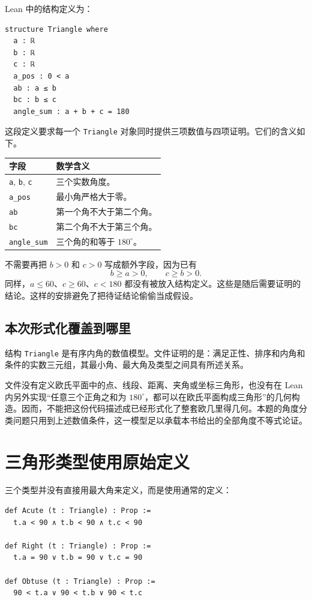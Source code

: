 \documentclass[UTF8,a4paper,zihao=-4,oneside,openany,fontset=fandol]{ctexbook}
\theoremstyle{definition}
\theoremstyle{remark}
\begin{document}
Lean 中的结构定义为：
\begin{Verbatim}[fontsize=\small,breaklines=true]
structure Triangle where
  a : ℝ
  b : ℝ
  c : ℝ
  a_pos : 0 < a
  ab : a ≤ b
  bc : b ≤ c
  angle_sum : a + b + c = 180
\end{Verbatim}

这段定义要求每一个 \texttt{Triangle} 对象同时提供三项数值与四项证明。它们的含义如下。

\begin{center}
\begin{tabularx}{\textwidth}{@{}lX@{}}
\toprule
字段 & 数学含义\\
\midrule
\texttt{a}, \texttt{b}, \texttt{c} & 三个实数角度。\\
\texttt{a\_pos} & 最小角严格大于零。\\
\texttt{ab} & 第一个角不大于第二个角。\\
\texttt{bc} & 第二个角不大于第三个角。\\
\texttt{angle\_sum} & 三个角的和等于 $180^\circ$。\\
\bottomrule
\end{tabularx}
\end{center}

不需要再把 $b>0$ 和 $c>0$ 写成额外字段，因为已有
\[
b\ge a>0,\qquad c\ge b>0.
\]
同样，$a\le60$、$c\ge60$、$c<180$ 都没有被放入结构定义。这些是随后需要证明的结论。这样的安排避免了把待证结论偷偷当成假设。

\subsection{本次形式化覆盖到哪里}

结构 \texttt{Triangle} 是有序内角的数值模型。文件证明的是：满足正性、排序和内角和条件的实数三元组，其最小角、最大角及类型之间具有所述关系。

文件没有定义欧氏平面中的点、线段、距离、夹角或坐标三角形，也没有在 Lean 内另外实现“任意三个正角之和为 $180^\circ$，都可以在欧氏平面构成三角形”的几何构造。因而，不能把这份代码描述成已经形式化了整套欧几里得几何。本题的角度分类问题只用到上述数值条件，这一模型足以承载本书给出的全部角度不等式论证。

\section{三角形类型使用原始定义}

三个类型并没有直接用最大角来定义，而是使用通常的定义：

\begin{Verbatim}[fontsize=\small,breaklines=true]
def Acute (t : Triangle) : Prop :=
  t.a < 90 ∧ t.b < 90 ∧ t.c < 90

def Right (t : Triangle) : Prop :=
  t.a = 90 ∨ t.b = 90 ∨ t.c = 90

def Obtuse (t : Triangle) : Prop :=
  90 < t.a ∨ 90 < t.b ∨ 90 < t.c
\end{Verbatim}
\end{document}
